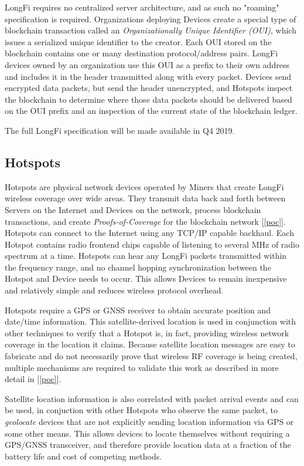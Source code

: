 \documentclass[10pt, nonatbib, nocopyrightspace, reprint]{sigplanconf}
\newcommand{\secref}[1]{[\autoref{#1}]}
\begin{document}
LongFi requires no centralized server architecture, and as such no "roaming" specification is required. Organizations deploying Devices create a special type of blockchain transaction called an \emph{Organizationally Unique Identifier (OUI)}, which issues a serialized unique identifier to the creator. Each OUI stored on the blockchain contains one or many destination protocol/address pairs. LongFi devices owned by an organization use this OUI as a prefix to their own address and includes it in the header transmitted along with every packet. Devices send encrypted data packets, but send the header unencrypted, and Hotspots inspect the blockchain to determine where those data packets should be delivered based on the OUI prefix and an inspection of the current state of the blockchain ledger. 

The full LongFi specification will be made available in Q4 2019.

\subsection{Hotspots}\label{hotspots}

Hotspots are physical network devices operated by Miners that create LongFi wireless coverage over wide areas. They transmit data back and forth between Servers on the Internet and Devices on the network, process blockchain transactions, and create \emph{Proofs-of-Coverage} for the blockchain network \secref{poc}. Hotspots can connect to the Internet using any TCP/IP capable backhaul. Each Hotspot contains radio frontend chips capable of listening to several MHz of radio spectrum at a time. Hotspots can hear any LongFi packets transmitted within the frequency range, and no channel hopping synchronization between the Hotspot and Device needs to occur. This allows Devices to remain inexpensive and relatively simple and reduces wireless protocol overhead.

Hotspots require a GPS or GNSS receiver to obtain accurate position and date/time information. This satellite-derived location is used in conjunction with other techniques to verify that a Hotspot is, in fact, providing wireless network coverage in the location it claims. Because satellite location messages are easy to fabricate and do not necessarily prove that wireless RF coverage is being created, multiple mechanisms are required to validate this work as described in more detail in \secref{poc}.

Satellite location information is also correlated with packet arrival events and can be used, in conjuction with other Hotspots who observe the same packet, to \emph{geolocate} devices that are not explicitly sending location information via GPS or some other means. This allows devices to locate themselves without requiring a GPS/GNSS transceiver, and therefore provide location data at a fraction of the battery life and cost of competing methods.
\end{document}
